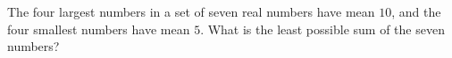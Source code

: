 The four largest numbers in a set of seven real numbers have mean $10$, and the four smallest numbers have mean $5$. What is the least possible sum of the seven numbers?
